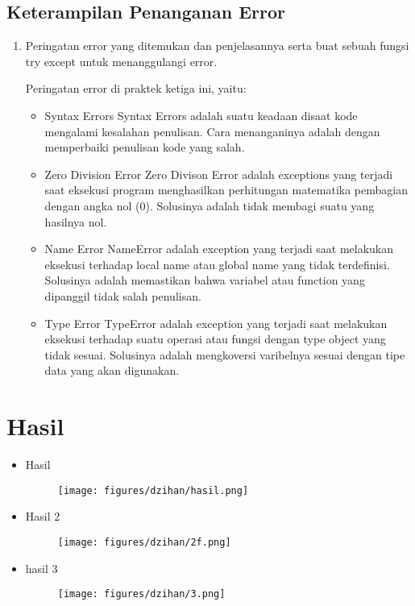 \subsection{Keterampilan Penanganan Error}
\begin{enumerate}
	\item Peringatan error yang ditemukan dan penjelasannya serta buat sebuah fungsi try except untuk menanggulangi error.
	
	Peringatan error di praktek ketiga ini, yaitu:
	\begin{itemize}
		\item Syntax Errors
		Syntax Errors adalah suatu keadaan disaat kode mengalami kesalahan penulisan. Cara menanganinya adalah dengan memperbaiki penulisan kode yang salah.
		
		\item Zero Division Error
		Zero Divison Error adalah exceptions yang terjadi saat eksekusi program menghasilkan perhitungan matematika pembagian dengan angka nol (0). Solusinya adalah tidak membagi suatu yang hasilnya nol.
		
		\item Name Error
		NameError adalah exception yang terjadi saat melakukan eksekusi terhadap local name atau global name yang tidak terdefinisi. Solusinya adalah memastikan bahwa variabel atau function yang dipanggil tidak salah penulisan.
		
		\item Type Error
		TypeError adalah exception yang terjadi saat melakukan eksekusi terhadap suatu operasi atau fungsi dengan type object yang tidak sesuai. Solusinya adalah mengkoversi varibelnya sesuai dengan tipe data yang akan digunakan.
		
	\end{itemize}
\end{enumerate}

\section{Hasil}
\begin{itemize}
	\item Hasil
	\begin{figure}[H]
		\texttt{[image: figures/dzihan/hasil.png]}
		\centering
	\end{figure}
	\item Hasil 2
	\begin{figure}[H]
		\texttt{[image: figures/dzihan/2f.png]}
		\centering
	\end{figure}
	\item hasil 3
	\begin{figure}[H]
		\texttt{[image: figures/dzihan/3.png]}
		\centering
	\end{figure}
\end{itemize}


